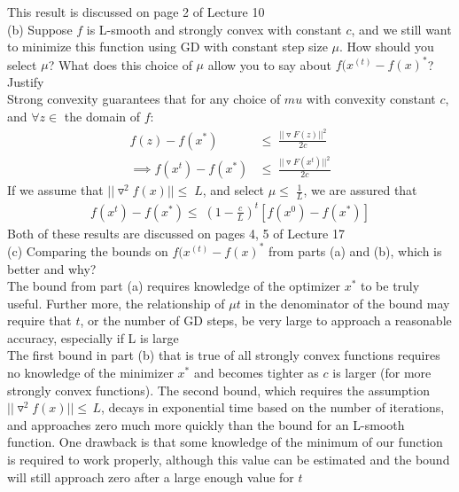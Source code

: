 \documentclass[12pt,letterpaper]{article}
\begin{document}
This result is discussed on page 2 of Lecture 10
\vspace{10pt}
\\
(b) Suppose $f$ is L-smooth and strongly convex with constant $c$, and we still want to minimize this function using GD with constant step size $\mu$.  How should you select $\mu$? What does this choice of $\mu$ allow you to say about $f(x^{(t)} - f(x)^*$? Justify
\vspace{10pt}\\
Strong convexity guarantees that for any choice of $mu$ with convexity constant $c$, and $\forall z \in$ the domain of $f$: 
\begin{equation*}
    \begin{split}
        f(z) - f(x^*) &\le\; \frac{||\triangledown F(z)||^2}{2c}
        \\
        \implies f(x^t) - f(x^*) &\le\; \frac{||\triangledown F(x^t)||^2}{2c}
    \end{split}
\end{equation*}
If we assume that $||\triangledown^2 f(x)|| \le\; L$, and select $\mu \le\; \frac{1}{L}$, we are assured that 
\begin{equation*}
    \begin{split}
        f(x^t)-f(x^*) \le\; (1-\frac{c}{L})^t [f(x^0) - f(x^*)]
    \end{split}
\end{equation*}
Both of these results are discussed on pages 4, 5 of Lecture 17
\vspace{10pt}
\\
(c) Comparing the bounds on $f(x^{(t)} - f(x)^*$ from parts (a) and (b), which is better and why?
\vspace{10pt}\\
The bound from part (a) requires knowledge of the optimizer $x^*$ to be truly useful. Further more, the relationship of $\mu t$ in the denominator of the bound may require that $t$, or the number of GD steps, be very large to approach a reasonable accuracy, especially if L is large
\vspace{10pt}
\\
The first bound in part (b) that is true of all strongly convex functions requires no knowledge of the minimizer $x^*$ and becomes tighter as $c$ is larger (for more strongly convex functions). The second bound, which requires the assumption $||\triangledown^2f(x)|| \le\, L$, decays in exponential time based on the number of iterations, and approaches zero much more quickly than the bound for an L-smooth function. One drawback is that some knowledge of the minimum of our function is required to work properly, although this value can be estimated and the bound will still approach zero after a large enough value for $t$
\end{document}
